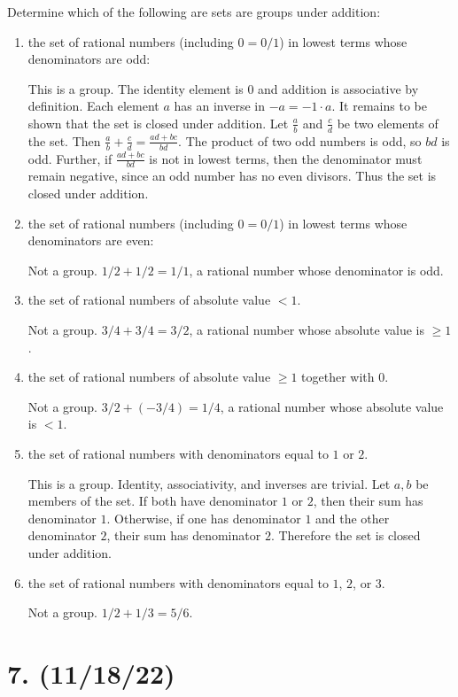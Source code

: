 \documentclass{article}
\begin{document}
Determine which of the following are sets are groups under addition:

\begin{enumerate}[label=\alph*)]
      \item the set of rational numbers (including $0 = 0/1$) in lowest terms whose denominators are odd:
      
            This is a group. The identity element is $0$ and addition is associative by definition. Each element $a$ has an inverse in $-a = -1 \cdot a$. It remains to be shown that the set is closed under addition. Let $\frac{a}{b}$ and $\frac{c}{d}$ be two elements of the set. Then $\frac{a}{b} + \frac{c}{d} = \frac{ad + bc}{bd}$. The product of two odd numbers is odd, so $bd$ is odd. Further, if $\frac{ad + bc}{bd}$ is not in lowest terms, then the denominator must remain negative, since an odd number has no even divisors. Thus the set is closed under addition.
      \item the set of rational numbers (including $0 = 0/1$) in lowest terms whose denominators are even:

            Not a group. $1/2 + 1/2 = 1/1$, a rational number whose denominator is odd.
      \item the set of rational numbers of absolute value $< 1$.

            Not a group. $3/4 + 3/4 = 3/2$, a rational number whose absolute value is $\geq 1$.
      \item the set of rational numbers of absolute value $\geq 1$ together with $0$.

            Not a group. $3/2 + (-3/4) = 1/4$, a rational number whose absolute value is $< 1$. 
      \item the set of rational numbers with denominators equal to $1$ or $2$.

            This is a group. Identity, associativity, and inverses are trivial. Let $a, b$ be members of the set. If both have denominator $1$ or $2$, then their sum has denominator $1$. Otherwise, if one has denominator $1$ and the other denominator $2$, their sum has denominator $2$. Therefore the set is closed under addition.
      \item the set of rational numbers with denominators equal to $1$, $2$, or $3$.

            Not a group. $1/2 + 1/3 = 5/6$.
\end{enumerate}

\section*{7. (11/18/22)}
\end{document}
